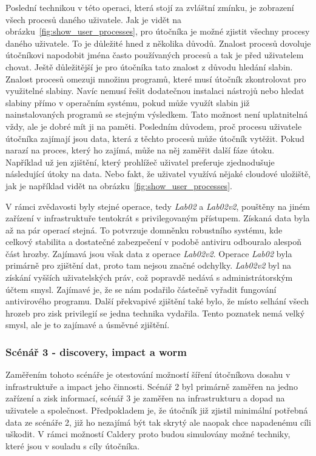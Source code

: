 
Poslední technikou v této operaci, která stojí za zvláštní zmínku, je zobrazení všech procesů daného uživatele.
Jak je vidět na obrázku~\ref{fig:show_user_processes}, pro útočníka je možné zjistit všechny procesy daného uživatele.
To je důležité hned z několika důvodů.
Znalost procesů dovoluje útočníkovi napodobit jména často používaných procesů a tak je před uživatelem chovat.
Ještě důležitější je pro útočníka tato znalost z důvodu hledání slabin.
Znalost procesů omezuji množinu programů, které musí útočník zkontrolovat pro využitelné slabiny.
Navíc nemusí řešit dodatečnou instalaci nástrojů nebo hledat slabiny přímo v operačním systému, pokud může využít slabin již nainstalovaných programů se stejným výsledkem.
Tato možnost není uplatnitelná vždy, ale je dobré mít ji na paměti.
Posledním důvodem, proč procesu uživatele útočníka zajímají jsou data, která z těchto procesů může útočník vytěžit.
Pokud narazí na proces, který ho zajímá, může na něj zaměřit další fáze útoku.
Například už jen zjištění, který prohlížeč uživatel preferuje zjednodušuje následující útoky na data.
Nebo fakt, že uživatel využívá nějaké cloudové uložiště, jak je například vidět na obrázku~\ref{fig:show_user_processes}.


V rámci zvědavosti byly stejné operace, tedy \textit{Lab02} a \textit{Lab02v2}, pouštěny na jiném zařízení v infrastruktuře tentokrát s privilegovaným přístupem.
Získaná data byla až na pár operací stejná.
To potvrzuje domněnku robustního systému, kde celkový stabilita a dostatečné zabezpečení v podobě antiviru odbouralo alespoň část hrozby.
Zajímavá jsou však data z operace \textit{Lab02v2}.
Operace \textit{Lab02} byla primárně pro zjištění dat, proto tam nejsou značné odchylky.
\textit{Lab02v2} byl na získání vyšších uživatelských práv, což popravdě nedává s administrátorským účtem smysl.
Zajímavé je, že se nám podařilo částečně vyřadit fungování antivirového programu.
Další překvapivé zjištění také bylo, že místo selhání všech hrozeb pro zisk privilegií se jedna technika vydařila.
Tento poznatek nemá velký smysl, ale je to zajímavé a úsměvné zjištění.


\subsubsection{Scénář 3 - discovery, impact a worm}
Zaměřením tohoto scénáře je otestování možností šíření útočníkova dosahu v infrastruktuře a impact jeho činnosti.
Scénář 2 byl primárně zaměřen na jedno zařízení a zisk informací, scénář 3 je zaměřen na infrastrukturu a dopad na uživatele a společnost.
Předpokladem je, že útočník již zjistil minimální potřebná data ze scénáře 2, již ho nezajímá být tak skrytý ale naopak chce napadenému cíli uškodit.
V rámci možností Caldery proto budou simulovány možné techniky, které jsou v souladu s cíly útočníka.

